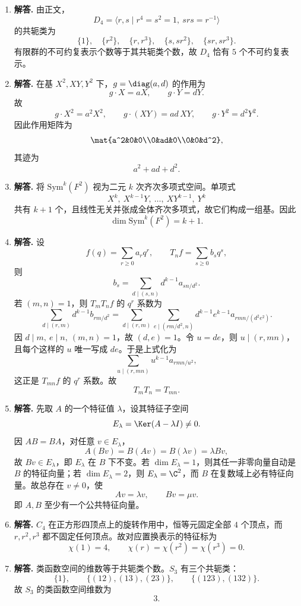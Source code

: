 \begin{enumerate}[label=\textbf{\arabic*.}, leftmargin=*, itemsep=1em]
\item \textbf{解答.} 由正文，
\[
D_4=\langle r,s\mid r^4=s^2=1,\ srs=r^{-1}\rangle
\]
的共轭类为
\[
\{1\},\quad \{r^2\},\quad \{r,r^3\},\quad \{s,sr^2\},\quad \{sr,sr^3\}.
\]
有限群的不可约复表示个数等于其共轭类个数，故 $D_4$ 恰有 $5$ 个不可约复表示。

\item \textbf{解答.} 在基 $X^2,XY,Y^2$ 下，$g=\diag(a,d)$ 的作用为
\[
g\cdot X=aX,\qquad g\cdot Y=dY.
\]
故
\[
g\cdot X^2=a^2X^2,\qquad g\cdot (XY)=ad\,XY,\qquad g\cdot Y^2=d^2Y^2.
\]
因此作用矩阵为
\[
\mat{a^2&0&0\\0&ad&0\\0&0&d^2},
\]
其迹为
\[
a^2+ad+d^2.
\]

\item \textbf{解答.} 将 $\mathrm{Sym}^k(F^2)$ 视为二元 $k$ 次齐次多项式空间。单项式
\[
X^k,\ X^{k-1}Y,\ \dots,\ XY^{k-1},\ Y^k
\]
共有 $k+1$ 个，且线性无关并张成全体齐次多项式，故它们构成一组基。因此
\[
\dim \mathrm{Sym}^k(F^2)=k+1.
\]

\item \textbf{解答.} 设
\[
f(q)=\sum_{r\ge0}a_rq^r,\qquad T_nf=\sum_{s\ge0}b_sq^s,
\]
则
\[
b_s=\sum_{d\mid(s,n)}d^{k-1}a_{sn/d^2}.
\]
若 $(m,n)=1$，则 $T_mT_nf$ 的 $q^r$ 系数为
\[
\sum_{d\mid(r,m)}d^{k-1}b_{rm/d^2}
=\sum_{d\mid(r,m)}\sum_{e\mid(rm/d^2,n)}d^{k-1}e^{k-1}a_{rmn/(d^2e^2)}.
\]
因 $d\mid m,\ e\mid n,\ (m,n)=1$，故 $(d,e)=1$。令 $u=de$，则 $u\mid(r,mn)$，且每个这样的 $u$ 唯一写成 $de$。于是上式化为
\[
\sum_{u\mid(r,mn)}u^{k-1}a_{rmn/u^2},
\]
这正是 $T_{mn}f$ 的 $q^r$ 系数。故
\[
T_mT_n=T_{mn}.
\]

\item \textbf{解答.} 先取 $A$ 的一个特征值 $\lambda$，设其特征子空间
\[
E_\lambda=\Ker(A-\lambda I)\neq0.
\]
因 $AB=BA$，对任意 $v\in E_\lambda$，
\[
A(Bv)=B(Av)=B(\lambda v)=\lambda Bv,
\]
故 $Bv\in E_\lambda$，即 $E_\lambda$ 在 $B$ 下不变。若 $\dim E_\lambda=1$，则其任一非零向量自动是 $B$ 的特征向量；若 $\dim E_\lambda=2$，则 $E_\lambda=\C^2$，而 $B$ 在复数域上必有特征向量。故总存在 $v\neq0$，使
\[
Av=\lambda v,\qquad Bv=\mu v.
\]
即 $A,B$ 至少有一个公共特征向量。

\item \textbf{解答.} $C_4$ 在正方形四顶点上的旋转作用中，恒等元固定全部 $4$ 个顶点，而 $r,r^2,r^3$ 都不固定任何顶点。故对应置换表示的特征标为
\[
\chi(1)=4,\qquad \chi(r)=\chi(r^2)=\chi(r^3)=0.
\]

\item \textbf{解答.} 类函数空间的维数等于共轭类个数。$S_3$ 有三个共轭类：
\[
\{1\},\qquad \{(12),(13),(23)\},\qquad \{(123),(132)\}.
\]
故 $S_3$ 的类函数空间维数为
\[
3.
\]


\end{enumerate}
